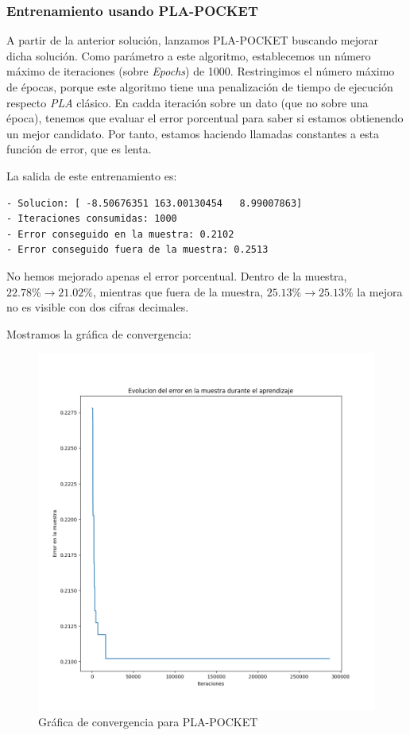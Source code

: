 \documentclass[11pt]{article}
\begin{document}
\subsubsection{Entrenamiento usando PLA-POCKET}

A partir de la anterior solución, lanzamos PLA-POCKET buscando mejorar dicha solución. Como parámetro a este algoritmo, establecemos un número máximo de iteraciones (sobre \emph{Epochs}) de 1000. Restringimos el número máximo de épocas, porque este algoritmo tiene una penalización de tiempo de ejecución respecto \emph{PLA} clásico. En cadda iteración sobre un dato (que no sobre una época), tenemos que evaluar el error porcentual para saber si estamos obtienendo un mejor candidato. Por tanto, estamos haciendo llamadas constantes a esta función de error, que es lenta.

La salida de este entrenamiento es:

\begin{lstlisting}[caption={Salida del entrenamiento de PLA-POCKET}, captionpos=b]
- Solucion: [ -8.50676351 163.00130454   8.99007863]
- Iteraciones consumidas: 1000
- Error conseguido en la muestra: 0.2102
- Error conseguido fuera de la muestra: 0.2513
\end{lstlisting}

No hemos mejorado apenas el error porcentual. Dentro de la muestra, $22.78\% \rightarrow 21.02\%$, mientras que fuera de la muestra, $25.13\% \rightarrow 25.13\%$ la mejora no es visible con dos cifras decimales.

Mostramos la gráfica de convergencia:

\begin{figure}[H]
    \centering
    \includegraphics[scale=0.4]{pla_pocket_convergencia}
    \caption{Gráfica de convergencia para PLA-POCKET}
\end{figure}
\end{document}
